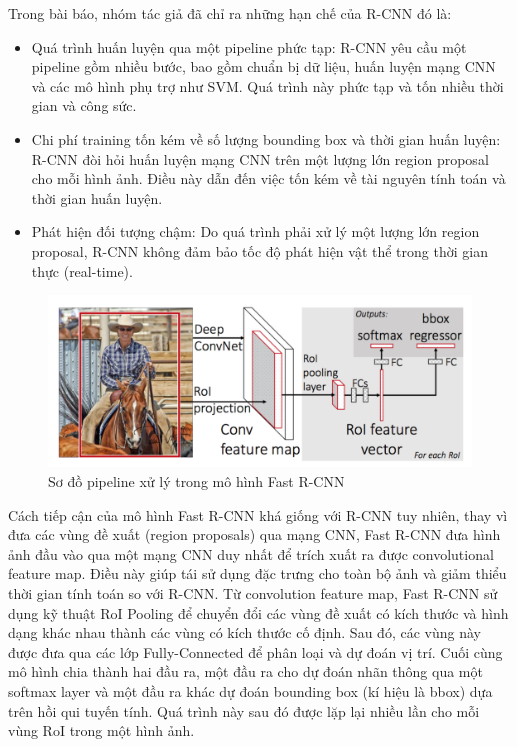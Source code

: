 Trong bài báo, nhóm tác giả đã chỉ ra những hạn chế của R-CNN đó là:
\begin{itemize}[noitemsep, topsep=0pt, leftmargin=1.25em, label={$-$}]
    \item Quá trình huấn luyện qua một pipeline phức tạp: R-CNN yêu cầu một pipeline gồm nhiều bước, bao gồm chuẩn bị dữ liệu, huấn luyện mạng CNN và các mô hình phụ trợ như SVM. Quá trình này phức tạp và tốn nhiều thời gian và công sức.
    \item Chi phí training tốn kém về số lượng bounding box và thời gian huấn luyện: R-CNN đòi hỏi huấn luyện mạng CNN trên một lượng lớn region proposal cho mỗi hình ảnh. Điều này dẫn đến việc tốn kém về tài nguyên tính toán và thời gian huấn luyện.
    \item Phát hiện đối tượng chậm: Do quá trình phải xử lý một lượng lớn region proposal, R-CNN không đảm bảo tốc độ phát hiện vật thể trong thời gian thực (real-time).
\end{itemize}
\graphicspath{{figures/}}
\begin{figure}[h!]
  \centering
  \includegraphics[scale=0.35]{graphics/fast-RCNN.png}
  \caption{Sơ đồ pipeline xử lý trong mô hình Fast R-CNN}
\end{figure}
Cách tiếp cận của mô hình Fast R-CNN khá giống với R-CNN tuy nhiên, thay vì đưa các vùng đề xuất (region proposals) qua mạng CNN, Fast R-CNN đưa hình ảnh đầu vào qua một mạng CNN duy nhất để trích xuất ra được convolutional feature map. Điều này giúp tái sử dụng đặc trưng cho toàn bộ ảnh và giảm thiểu thời gian tính toán so với R-CNN. Từ convolution feature map, Fast R-CNN sử dụng kỹ thuật RoI Pooling để chuyển đổi các vùng đề xuất có kích thước và hình dạng khác nhau thành các vùng có kích thước cố định. Sau đó, các vùng này được đưa qua các lớp Fully-Connected để phân loại và dự đoán vị trí. Cuối cùng mô hình chia thành hai đầu ra, một đầu ra cho dự đoán nhãn thông qua một softmax layer và một đầu ra khác dự đoán bounding box (kí hiệu là bbox) dựa trên hồi qui tuyến tính. Quá trình này sau đó được lặp lại nhiều lần cho mỗi vùng RoI trong một hình ảnh.


